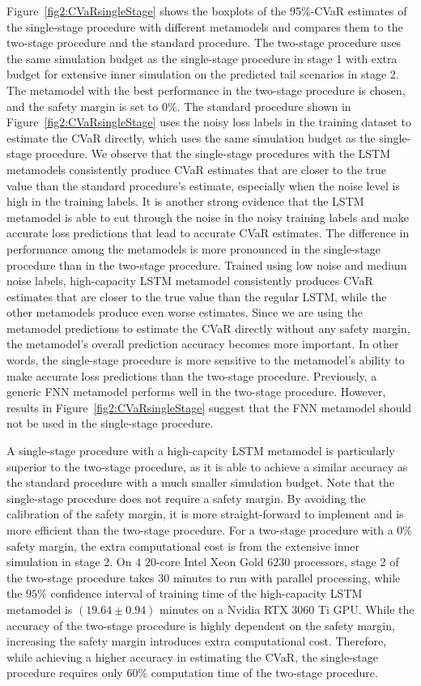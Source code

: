 Figure~\ref{fig2:CVaRsingleStage} shows the boxplots of the 95\%-CVaR estimates of the single-stage procedure with different metamodels and compares them to the two-stage procedure and the standard procedure.
The two-stage procedure uses the same simulation budget as the single-stage procedure in stage 1 with extra budget for extensive inner simulation on the predicted tail scenarios in stage 2.
The metamodel with the best performance in the two-stage procedure is chosen, and the safety margin is set to $0\%$.
The standard procedure shown in Figure~\ref{fig2:CVaRsingleStage} uses the noisy loss labels in the training dataset to estimate the CVaR directly, which uses the same simulation budget as the single-stage procedure.
We observe that the single-stage procedures with the LSTM metamodels consistently produce CVaR estimates that are closer to the true value than the standard procedure's estimate, especially when the noise level is high in the training labels.
It is another strong evidence that the LSTM metamodel is able to cut through the noise in the noisy training labels and make accurate loss predictions that lead to accurate CVaR estimates.
The difference in performance among the metamodels is more pronounced in the single-stage procedure than in the two-stage procedure.
Trained using low noise and medium noise labels, high-capacity LSTM metamodel consistently produces CVaR estimates that are closer to the true value than the regular LSTM, while the other metamodels produce even worse estimates.
Since we are using the metamodel predictions to estimate the CVaR directly without any safety margin, the metamodel's overall prediction accuracy becomes more important.
In other words, the single-stage procedure is more sensitive to the metamodel's ability to make accurate loss predictions than the two-stage procedure.
Previously, a generic FNN metamodel performs well in the two-stage procedure. 
However, results in Figure~\ref{fig2:CVaRsingleStage} suggest that the FNN metamodel should not be used in the single-stage procedure.

A single-stage procedure with a high-capcity LSTM metamodel is particularly superior to the two-stage procedure, as it is able to achieve a similar accuracy as the standard procedure with a much smaller simulation budget.
Note that the single-stage procedure does not require a safety margin.
By avoiding the calibration of the safety margin, it is more straight-forward to implement and is more efficient than the two-stage procedure.
For a two-stage procedure with a $0\%$ safety margin, the extra computational cost is from the extensive inner simulation in stage 2.
On $4$ $20$-core Intel Xeon Gold $\num{6230}$ processors, stage 2 of the two-stage procedure takes $30$ minutes to run with parallel processing, while the $95\%$ confidence interval of training time of the high-capacity LSTM metamodel is $(19.64 \pm 0.94)$ minutes on a Nvidia RTX $\num{3060}$ Ti GPU.
While the accuracy of the two-stage procedure is highly dependent on the safety margin, increasing the safety margin introduces extra computational cost.
Therefore, while achieving a higher accuracy in estimating the CVaR, the single-stage procedure requires only $60\%$ computation time of the two-stage procedure.


